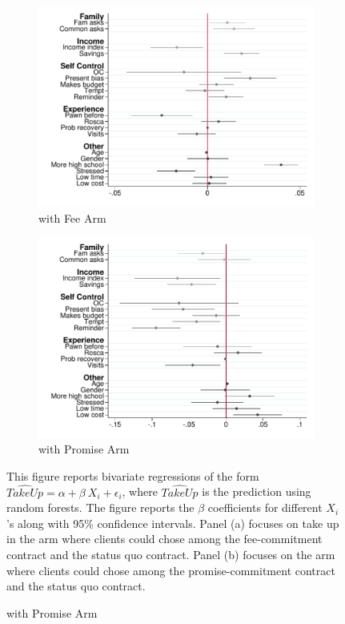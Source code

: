 \documentclass[11pt]{article}
\begin{document}
\begin{figure}[H]
    \caption{Predictors of commitment contract take-up}
    \label{interactions_takeup}
    \begin{center}
    \begin{subfigure}{0.45\textwidth}
        \caption{with Fee Arm}
        \centering
        \includegraphics[width=\textwidth]{Figuras/pago_frec_vol_fee_interactions_rf.pdf}
    \end{subfigure}
    \begin{subfigure}{0.45\textwidth}
        \caption{with Promise Arm}
        \centering
        \includegraphics[width=\textwidth]{Figuras/pago_frec_vol_promise_interactions_rf.pdf}
    \end{subfigure}
    \end{center}
     \scriptsize This figure reports bivariate regressions of the form $\widehat{TakeUp} = \alpha + \beta \: X_i + \epsilon_i$, where $\widehat{TakeUp}$ is the prediction using random forests. The figure reports the $\beta$ coefficients for different $X_i$'s along with 95\% confidence intervals. Panel (a) focuses on take up in the arm where clients could chose among the fee-commitment contract and the status quo contract. Panel (b) focuses on the arm where clients could chose among the promise-commitment contract and the status quo contract. 
     
\end{figure}
\end{document}

